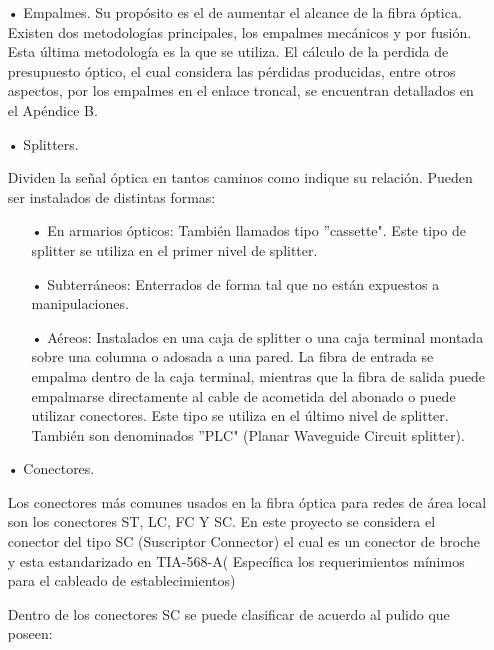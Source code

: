 \begin{enumerate}
\begin{enumerate}
\end{enumerate}


\item[•]Empalmes.
Su propósito es el de aumentar el alcance de la fibra óptica. Existen dos metodologías principales, los empalmes mecánicos y por fusión. Esta última metodología es la que se utiliza. El cálculo de la perdida de presupuesto óptico, el cual considera las pérdidas producidas, entre otros aspectos, por los empalmes en el enlace troncal, se encuentran detallados en el Apéndice B.


\item[•]Splitters.

Dividen la señal óptica en tantos caminos como indique su relación. Pueden ser instalados de distintas formas:
\begin{enumerate}
\item[•]En armarios ópticos: También llamados tipo ''cassette". Este tipo de splitter se utiliza en el primer nivel de splitter.
\item[•]Subterráneos: Enterrados de forma tal que no están expuestos a manipulaciones.
\item[•]Aéreos: Instalados en una caja de splitter o una caja terminal montada sobre una columna o adosada a una pared. La fibra de entrada se empalma dentro de la caja terminal, mientras que la fibra de salida puede empalmarse directamente al cable de acometida del abonado o puede utilizar conectores. Este tipo se utiliza en el último nivel de splitter. También son denominados ''PLC" (Planar Waveguide Circuit splitter).

\end{enumerate}




\item[•]Conectores.


Los conectores más comunes usados en la fibra óptica para redes de área local son los conectores ST, LC, FC Y SC. En este proyecto se considera el conector del tipo SC (Suscriptor Connector) el cual es un conector de broche y esta estandarizado en TIA-568-A( Específica los requerimientos mínimos para el cableado de 
establecimientos)

Dentro de los conectores SC se puede clasificar de acuerdo al pulido que poseen:


\end{enumerate}
